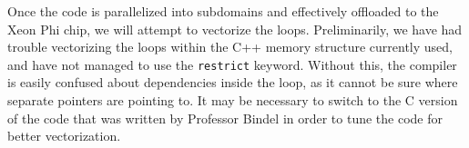 \documentclass[12pt]{article}
\begin{document}
Once the code is parallelized into subdomains and effectively offloaded to the Xeon Phi chip, we will attempt to vectorize the loops. Preliminarily, we have had trouble vectorizing the loops within the C++ memory structure currently used, and have not managed to use the \texttt{restrict} keyword. Without this, the compiler is easily confused about dependencies inside the loop, as it cannot be sure where separate pointers are pointing to. It may be necessary to switch to the C version of the code that was written by Professor Bindel in order to tune the code for better vectorization.


%	 
%	
	
\end{document}

